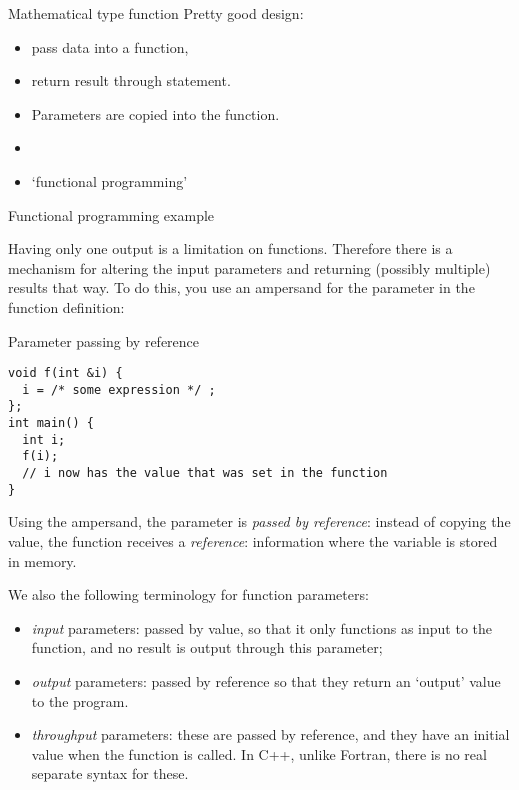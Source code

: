\begin{slide}{Mathematical type function}
  \label{sl:func-functional}
  Pretty good design:
  \begin{itemize}
  \item pass data into a function,
  \item return result through  statement.
  \item Parameters are copied into the function.
  \item {}
  \item `functional programming'
  \end{itemize}
\end{slide}
\begin{slide}{Functional programming example}
  \label{sl:func-functional-ex}
\end{slide}

Having only one output is a limitation on functions. Therefore there
is a mechanism for altering the input parameters and returning
(possibly multiple) results that way. To do this, you use an ampersand
for the parameter in the function definition:

\begin{block}{Parameter passing by reference}
  \label{sl:pass-by-ref}
\begin{verbatim}
void f(int &i) {
  i = /* some expression */ ;
};
int main() {
  int i;
  f(i);
  // i now has the value that was set in the function
}
\end{verbatim}
\end{block}

Using the ampersand, the parameter is
\emph{passed by reference}:
instead of copying the value, the function receives a \emph{reference}:
information where the variable is stored in memory.

We also the following terminology for function parameters:
\begin{itemize}
\item \emph{input} parameters: passed by
  value, so that it only functions as input to the function, and no
  result is output through this parameter;
\item \emph{output} parameters: passed
  by reference so that they return an `output' value to the program.
\item \emph{throughput} parameters:
  these are passed by reference, and they have an initial value when
  the function is called. In C++, unlike Fortran, there is no real
  separate syntax for these.
\end{itemize}

